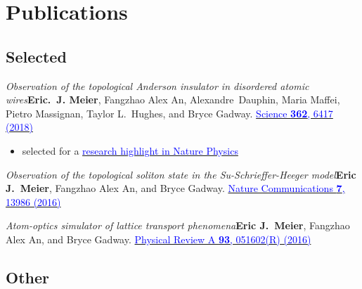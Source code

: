 \documentclass[12pt,letterpaper,sans]{moderncv}
\newcommand*{\paper}[4]{\textit{#1}\newline #2. \newline\href{#3}{\textcolor{blue}{#4}}}
\begin{document}
\section{Publications}

\subsection{Selected}

\begin{etaremune}[start=13,topsep=0pt,itemsep=4pt,partopsep=0pt,parsep=0pt]

\item \paper{Observation of the topological Anderson insulator in disordered atomic wires}{\textbf{Eric.~J. Meier}, Fangzhao Alex An, Alexandre~Dauphin, Maria Maffei, Pietro Massignan, Taylor L.\ Hughes, and Bryce Gadway}{http://science.sciencemag.org/content/362/6417/929.full?ijkey=bU33NGPrjqfmg&keytype=ref&siteid=sci}{Science \textbf{362}, 6417 (2018)}
\begin{itemize}
\item selected for a \href{https://www.nature.com/articles/s41567-018-0399-y}{\textcolor{blue}{research highlight in Nature Physics}}
\end{itemize}

\item \paper{Observation of the topological soliton state in the Su-Schrieffer-Heeger model}{\textbf{Eric J.\ Meier}, Fangzhao Alex An, and Bryce Gadway}{http://www.nature.com/articles/ncomms13986}{Nature Communications \textbf{7}, 13986 (2016)}

\item \paper{Atom-optics simulator of lattice transport phenomena}{\textbf{Eric J.\ Meier}, Fangzhao Alex An, and Bryce Gadway}{http://journals.aps.org/pra/abstract/10.1103/PhysRevA.93.051602}{Physical Review A \textbf{93}, 051602(R) (2016)}
\end{etaremune}

\subsection{Other}
\end{document}
